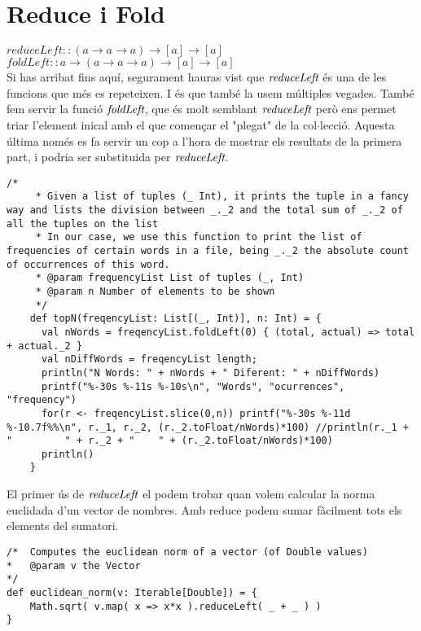 \documentclass{report}
\begin{document}
\newpage

\section{Reduce i Fold}

$ reduceLeft :: (a \rightarrow a \rightarrow a) \rightarrow [a] \rightarrow [a] $ \\
$ foldLeft :: a \rightarrow (a \rightarrow a \rightarrow a) \rightarrow [a] \rightarrow [a] $ \\

Si has arribat fins aquí, segurament hauras vist que $\emph{reduceLeft}$ és una de les funcions que més es repeteixen. I és que també la usem múltiples vegades. També fem servir la funció $ \emph{foldLeft}$, que és molt semblant $\emph{reduceLeft}$ però ens permet triar l'element inical amb el que començar el "plegat" de la col$\cdot$lecció. Aquesta última només es fa servir un cop a l'hora de mostrar els resultats de la primera part, i podria ser substituida per $\emph{reduceLeft}$.

\begin{lstlisting}[style=scalaHighlight]
/*
     * Given a list of tuples (_ Int), it prints the tuple in a fancy way and lists the division between _._2 and the total sum of _._2 of all the tuples on the list
     * In our case, we use this function to print the list of frequencies of certain words in a file, being _._2 the absolute count of occurrences of this word.
     * @param frequencyList List of tuples (_, Int)
     * @param n Number of elements to be shown
     */
    def topN(freqencyList: List[(_, Int)], n: Int) = {
      val nWords = freqencyList.foldLeft(0) { (total, actual) => total + actual._2 }
      val nDiffWords = freqencyList length;
      println("N Words: " + nWords + " Diferent: " + nDiffWords)
      printf("%-30s %-11s %-10s\n", "Words", "ocurrences", "frequency")
      for(r <- freqencyList.slice(0,n)) printf("%-30s %-11d %-10.7f%%\n", r._1, r._2, (r._2.toFloat/nWords)*100) //println(r._1 + "			" + r._2 + "	" + (r._2.toFloat/nWords)*100)
      println()
    }
\end{lstlisting}

El primer ús de $\emph{reduceLeft}$ el podem trobar quan volem calcular la norma euclidada d'un vector de nombres. Amb reduce podem sumar fàcilment tots els elements del sumatori.

\begin{lstlisting}[style=scalaHighlight]
/*	Computes the euclidean norm of a vector (of Double values)
*	@param v the Vector
*/
def euclidean_norm(v: Iterable[Double]) = {
    Math.sqrt( v.map( x => x*x ).reduceLeft( _ + _ ) )
}
\end{lstlisting}
\end{document}
